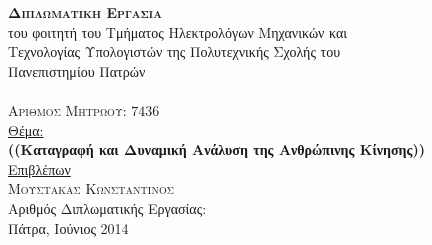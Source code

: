 \hfill
{}
\noindent\makebox[\textwidth]{\rule{\textwidth}{0.4pt}}

\vspace{1.5cm}

\begin{center}
    {\Huge\textsc{\textbf{Διπλωματικη Εργασια}}}\\
    {\Large του φοιτητή του Τμήματος Ηλεκτρολόγων Μηχανικών και\\
    Τεχνολογίας Υπολογιστών της Πολυτεχνικής Σχολής του\\
    Πανεπιστημίου Πατρών}\\[2cm]
    {\Large\textsc{}}\\[10pt]
    {\Large\textsc{Αριθμος Μητρωου: $7436$}}\\[1.5cm]
    {\Large \uline{Θέμα:}}\\[10pt]
    {\Large\textbf{((Καταγραφή και Δυναμική Ανάλυση της Ανθρώπινης Κίνησης))}}\\[2cm]
    {\Large \uline{Επιβλέπων}}\\[10pt]
    {\Large\textsc{Μουστακας Κωνσταντινος}}\\[2cm]
    {\Large Αριθμός Διπλωματικής Εργασίας:}\\
    \vfill
    {\Large{Πάτρα, Ιούνιος 2014}}
\end{center}

